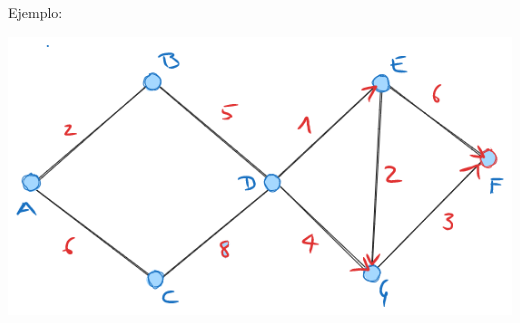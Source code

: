 \documentclass[notheorems]{beamer}
\begin{document}
\begin{frame}{Ejemplo:}
\begin{center}
\includegraphics[scale = 0.5]{M3_Dijkstra_Graph.png}
\end{center}
\end{frame}
\end{document}
